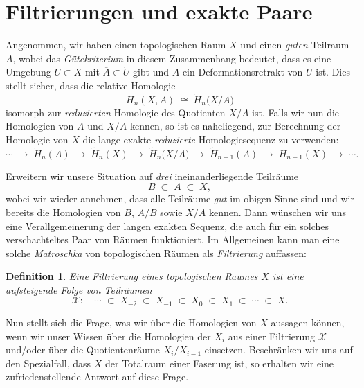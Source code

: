 \documentclass[12pt, hidelinks]{article}
\numberwithin{conj}{section}
\newtheorem{definition}[conj]{Definition}
\begin{document}
\section{Filtrierungen und exakte Paare}
Angenommen, wir haben einen topologischen Raum $X$ und einen \emph{guten} Teilraum $A$, wobei das \emph{Gütekriterium} in diesem Zusammenhang bedeutet, dass es eine Umgebung $U \subset X$ mit $\overline{A} \subset \mathring{U}$ gibt und $A$ ein Deformationsretrakt von $U$ ist. Dies stellt sicher, dass die relative Homologie
\[
    H_n(X,A) \;\cong\; \tilde{H}_n\bigl(X/A\bigr)
\]
isomorph zur \emph{reduzierten} Homologie des Quotienten $X/A$ ist. Falls wir nun die Homologien von $A$ und $X/A$ kennen, so ist es naheliegend, zur Berechnung der Homologie von $X$ die lange exakte \emph{reduzierte} Homologiesequenz zu verwenden:
\[
    \cdots \;\longrightarrow\; \tilde{H}_n(A)
    \;\longrightarrow\; \tilde{H}_n(X)
    \;\longrightarrow\; \tilde{H}_n\bigl(X/A\bigr)
    \;\longrightarrow\;
    \tilde{H}_{n-1}(A)
    \;\longrightarrow\;
    \tilde{H}_{n-1}(X)
    \;\longrightarrow\; \cdots.
\]

Erweitern wir unsere Situation auf \emph{drei} ineinanderliegende Teilräume
\[
    B \;\subset\; A \;\subset\; X,
\]
wobei wir wieder annehmen, dass alle Teilräume \emph{gut} im obigen Sinne sind und wir bereits die Homologien von $B$, $A/B$ sowie $X/A$ kennen. Dann wünschen wir uns eine Verallgemeinerung der langen exakten Sequenz, die auch für ein solches verschachteltes Paar von Räumen funktioniert. Im Allgemeinen kann man eine solche \emph{Matroschka} von topologischen Räumen als \emph{Filtrierung} auffassen:

\begin{definition}
    Eine \emph{Filtrierung} eines topologischen Raumes $X$ ist eine aufsteigende Folge von Teilräumen
    \[
        \mathcal{X}:\quad
        \cdots \;\subset\; X_{-2} \;\subset\; X_{-1}
        \;\subset\; X_{0} \;\subset\; X_{1} \;\subset\; \cdots \;\subset\; X.
    \]
\end{definition}

Nun stellt sich die Frage, was wir über die Homologien von $X$ aussagen können, wenn wir unser Wissen über die Homologien der $X_i$ aus einer Filtrierung $\mathcal{X}$ und/oder über die Quotientenräume $X_i/X_{i-1}$ einsetzen. Beschränken wir uns auf den Spezialfall, dass $X$ der Totalraum einer Faserung ist, so erhalten wir eine zufriedenstellende Antwort auf diese Frage.
\end{document}
